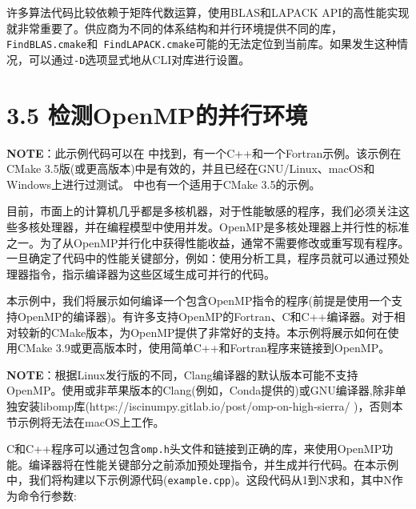 
许多算法代码比较依赖于矩阵代数运算，使用BLAS和LAPACK API的高性能实现就非常重要了。供应商为不同的体系结构和并行环境提供不同的库，\texttt{FindBLAS.cmake}和\texttt{ FindLAPACK.cmake}可能的无法定位到当前库。如果发生这种情况，可以通过\texttt{-D}选项显式地从CLI对库进行设置。


\section{3.5 检测OpenMP的并行环境}

\begin{myInfoBox}
\textbf{NOTE}：此示例代码可以在  中找到，有一个C++和一个Fortran示例。该示例在CMake 3.5版(或更高版本)中是有效的，并且已经在GNU/Linux、macOS和Windows上进行过测试。 中也有一个适用于CMake 3.5的示例。
\end{myInfoBox}

目前，市面上的计算机几乎都是多核机器，对于性能敏感的程序，我们必须关注这些多核处理器，并在编程模型中使用并发。OpenMP是多核处理器上并行性的标准之一。为了从OpenMP并行化中获得性能收益，通常不需要修改或重写现有程序。一旦确定了代码中的性能关键部分，例如：使用分析工具，程序员就可以通过预处理器指令，指示编译器为这些区域生成可并行的代码。

本示例中，我们将展示如何编译一个包含OpenMP指令的程序(前提是使用一个支持OpenMP的编译器)。有许多支持OpenMP的Fortran、C和C++编译器。对于相对较新的CMake版本，为OpenMP提供了非常好的支持。本示例将展示如何在使用CMake 3.9或更高版本时，使用简单C++和Fortran程序来链接到OpenMP。

\begin{myInfoBox}
\textbf{NOTE}：根据Linux发行版的不同，Clang编译器的默认版本可能不支持OpenMP。使用或非苹果版本的Clang(例如，Conda提供的)或GNU编译器,除非单独安装libomp库(https://iscinumpy.gitlab.io/post/omp-on-high-sierra/ )，否则本节示例将无法在macOS上工作。
\end{myInfoBox}


C和C++程序可以通过包含\texttt{omp.h}头文件和链接到正确的库，来使用OpenMP功能。编译器将在性能关键部分之前添加预处理指令，并生成并行代码。在本示例中，我们将构建以下示例源代码(\texttt{example.cpp})。这段代码从1到N求和，其中N作为命令行参数:

